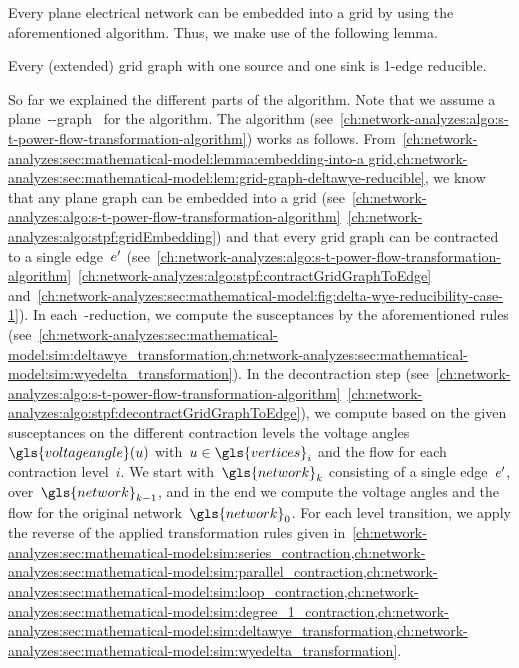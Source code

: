 Every plane electrical network can be embedded into a grid by using the
aforementioned algorithm. Thus, we make use of the following lemma.
% 
\begin{lemma}
    Every (extended) grid graph with one source and one sink is 1-edge
    reducible.
    \label{ch:network-analyzes:sec:mathematical-model:lem:grid-graph-deltawye-reducible}
\end{lemma}
% 
So far we explained the different parts of the algorithm. Note that we assume a
plane~\source-\sink-graph~ for the
algorithm. The algorithm (see~\cref{ch:network-analyzes:algo:s-t-power-flow-transformation-algorithm}) works as follows.
From~\cref{ch:network-analyzes:sec:mathematical-model:lemma:embedding-into-a
grid,ch:network-analyzes:sec:mathematical-model:lem:grid-graph-deltawye-reducible},
we know that any plane graph can be embedded into a grid
(see~\cref{ch:network-analyzes:algo:s-t-power-flow-transformation-algorithm}~\cref{ch:network-analyzes:algo:stpf:gridEmbedding})
and that every grid graph can be contracted to a single edge~$e'$
(see~\cref{ch:network-analyzes:algo:s-t-power-flow-transformation-algorithm}~\cref{ch:network-analyzes:algo:stpf:contractGridGraphToEdge}
and~\cref{ch:network-analyzes:sec:mathematical-model:fig:delta-wye-reducibility-case-1}).
In each~\deltawye-reduction, we compute the susceptances by the aforementioned
rules
(see~\cref{ch:network-analyzes:sec:mathematical-model:sim:deltawye_transformation,ch:network-analyzes:sec:mathematical-model:sim:wyedelta_transformation}).
% 
In the decontraction step
(see~\cref{ch:network-analyzes:algo:s-t-power-flow-transformation-algorithm}~\cref{ch:network-analyzes:algo:stpf:decontractGridGraphToEdge}),
we compute based on the given susceptances on the different contraction levels
the voltage angles~$\gls{voltageangle}(\vertexa)$
with~$\vertexa\in\gls{vertices}_i$ and the flow for each contraction level~$i$.
We start with~$\gls{network}_k$ consisting of a single edge~$e'$,
over~$\gls{network}_{k-1}$, and in the end we compute the voltage angles and the
flow for the original network~$\gls{network}_0$. For each level transition, we
apply the reverse of the applied transformation rules given
in~\cref{ch:network-analyzes:sec:mathematical-model:sim:series_contraction,ch:network-analyzes:sec:mathematical-model:sim:parallel_contraction,ch:network-analyzes:sec:mathematical-model:sim:loop_contraction,ch:network-analyzes:sec:mathematical-model:sim:degree_1_contraction,ch:network-analyzes:sec:mathematical-model:sim:deltawye_transformation,ch:network-analyzes:sec:mathematical-model:sim:wyedelta_transformation}.
